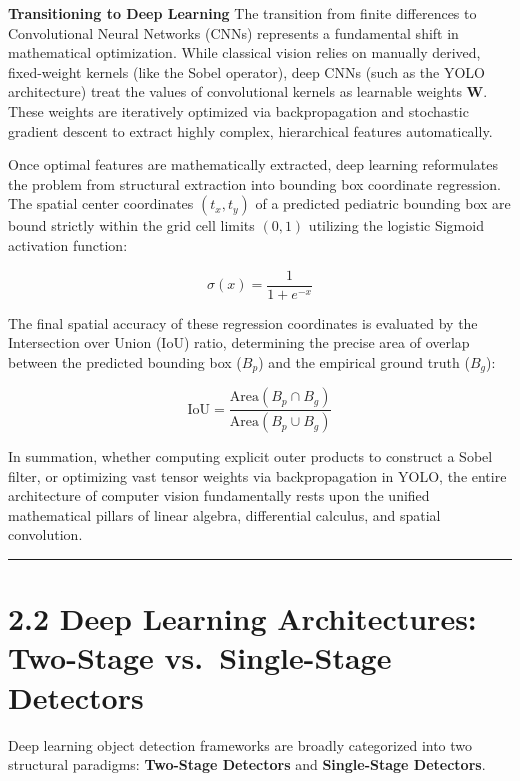 \textbf{Transitioning to Deep Learning} The transition from finite
differences to Convolutional Neural Networks (CNNs) represents a
fundamental shift in mathematical optimization. While classical vision
relies on manually derived, fixed-weight kernels (like the Sobel
operator), deep CNNs (such as the YOLO architecture) treat the values of
convolutional kernels as learnable weights \(\mathbf{W}\). These weights
are iteratively optimized via backpropagation and stochastic gradient
descent to extract highly complex, hierarchical features automatically.

Once optimal features are mathematically extracted, deep learning
reformulates the problem from structural extraction into bounding box
coordinate regression. The spatial center coordinates \((t_x, t_y)\) of
a predicted pediatric bounding box are bound strictly within the grid
cell limits \((0, 1)\) utilizing the logistic Sigmoid activation
function:

\[\sigma(x) = \frac{1}{1 + e^{-x}}\]

The final spatial accuracy of these regression coordinates is evaluated
by the Intersection over Union (IoU) ratio, determining the precise area
of overlap between the predicted bounding box (\(B_p\)) and the
empirical ground truth (\(B_g\)):

\[\text{IoU} = \frac{\text{Area}(B_p \cap B_g)}{\text{Area}(B_p \cup B_g)}\]

In summation, whether computing explicit outer products to construct a
Sobel filter, or optimizing vast tensor weights via backpropagation in
YOLO, the entire architecture of computer vision fundamentally rests
upon the unified mathematical pillars of linear algebra, differential
calculus, and spatial convolution.

\begin{center}\rule{0.5\linewidth}{0.5pt}\end{center}

\section{2.2 Deep Learning Architectures: Two-Stage vs.~Single-Stage
Detectors}\label{deep-learning-architectures-two-stage-vs.-single-stage-detectors}

Deep learning object detection frameworks are broadly categorized into
two structural paradigms: \textbf{Two-Stage Detectors} and
\textbf{Single-Stage Detectors}.

